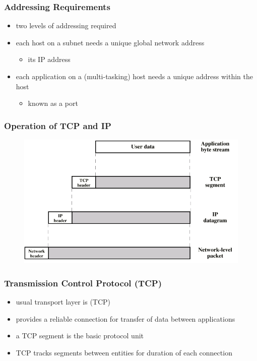 \documentclass[pdflatex,compress]{beamer}
\begin{document}
\begin{frame}
	\frametitle{Addressing Requirements}
	\begin{itemize}
		\item two levels of addressing required
		\item each host on a subnet needs a unique global network address
		\begin{itemize}
			\item its IP address
		\end{itemize}
		\item each application on a (multi-tasking) host needs a unique address within the host
		\begin{itemize}
			\item known as a port
		\end{itemize}
	\end{itemize}
\end{frame}

\begin{frame}
	\frametitle{Operation of TCP and IP}
	\begin{figure}
		\centering
		\includegraphics[width=0.8\linewidth]{img/img03}
	\end{figure}
\end{frame}

\begin{frame}
	\frametitle{Transmission Control Protocol (TCP)}
	\begin{itemize}
		\item usual transport layer is (TCP)
		\item provides a reliable connection for transfer of data between applications
		\item a TCP segment is the basic protocol unit
		\item TCP tracks segments between entities for duration of each connection
	\end{itemize}
\end{frame}
\end{document}
